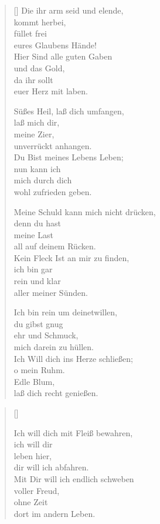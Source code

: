 \begin{multicols}{2}
\begin{verse}[\versewidth]
 Die ihr arm seid und elende,\\
kommt herbei,\\
füllet frei\\
eures Glaubens Hände!\\
Hier Sind alle guten Gaben\\
und das Gold,\\
da ihr sollt\\
euer Herz mit laben.
 
 Süßes Heil, laß dich umfangen,\\
laß mich dir,\\
meine Zier,\\
unverrückt anhangen.\\
Du Bist meines Lebens Leben;\\
nun kann ich\\
mich durch dich\\
wohl zufrieden geben.
\pagebreak

 Meine Schuld kann mich nicht drücken,\\
denn du hast\\
meine Last\\
all auf deinem Rücken.\\
Kein Fleck Ist an mir zu finden,\\
ich bin gar\\
rein und klar\\
aller meiner Sünden.
 
 Ich bin rein um deinetwillen,\\
du gibst gnug\\
ehr und Schmuck,\\
mich darein zu hüllen.\\
Ich Will dich ins Herze schließen;\\
o mein Ruhm.\\
Edle Blum,\\
laß dich recht genießen.

\end{verse}
\end{multicols}

\begin{center}
\settowidth{\versewidth}{Ich will dich mit Fleiß bewahren,}
\begin{verse}[\versewidth]

 Ich will dich mit Fleiß bewahren,\\ %
ich will dir\\
leben hier,\\
dir will ich abfahren.\\
Mit Dir will ich endlich schweben\\
voller Freud,\\
ohne Zeit\\
dort im andern Leben.
  
\end{verse}
\end{center}
 



